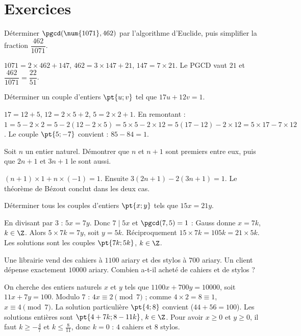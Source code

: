 \mxnewpage
\section{Exercices}
\begin{exercise}
Déterminer $\pgcd(\num{1071},462)$ par l'algorithme d'Euclide, puis simplifier la fraction $\dfrac{462}{\num{1071}}$.
\end{exercise}
\begin{solution}
$\num{1071}=2\times462+147$, $462=3\times147+21$, $147=7\times21$. Le PGCD vaut $21$ et $\dfrac{462}{\num{1071}}=\dfrac{22}{51}$.
\end{solution}

\begin{exercise}
Déterminer un couple d'entiers $\pt{u;v}$ tel que $17u+12v=1$.
\end{exercise}
\begin{solution}
$17=12+5$, $12=2\times5+2$, $5=2\times2+1$. En remontant : $1=5-2\times2=5-2(12-2\times5)=5\times5-2\times12=5(17-12)-2\times12=5\times17-7\times12$. Le couple $\pt{5;-7}$ convient : $85-84=1$.
\end{solution}

\begin{exercise}
Soit $n$ un entier naturel. Démontrer que $n$ et $n+1$ sont premiers entre eux, puis que $2n+1$ et $3n+1$ le sont aussi.
\end{exercise}
\begin{solution}
$(n+1)\times1+n\times(-1)=1$. Ensuite $3(2n+1)-2(3n+1)=1$. Le théorème de Bézout conclut dans les deux cas.
\end{solution}

\begin{exercise}
Déterminer tous les couples d'entiers $\pt{x;y}$ tels que $15x=21y$.
\end{exercise}
\begin{solution}
En divisant par $3$ : $5x=7y$. Donc $7\mid5x$ et $\pgcd(7,5)=1$ : Gauss donne $x=7k$, $k\in\Z$. Alors $5\times7k=7y$, soit $y=5k$. Réciproquement $15\times7k=105k=21\times5k$. Les solutions sont les couples $\pt{7k;5k}$, $k\in\Z$.
\end{solution}

\begin{exercise}
Une librairie vend des cahiers à $\num{1100}$ ariary et des stylos à $700$ ariary. Un client dépense exactement $\num{10000}$ ariary. Combien a-t-il acheté de cahiers et de stylos ?
\end{exercise}
\begin{solution}
On cherche des entiers naturels $x$ et $y$ tels que $\num{1100}x+700y=\num{10000}$, soit $11x+7y=100$. Modulo $7$ : $4x\equiv2\pmod7$ ; comme $4\times2=8\equiv1$, $x\equiv4\pmod7$. La solution particulière $\pt{4;8}$ convient ($44+56=100$). Les solutions entières sont $\pt{4+7k;8-11k}$, $k\in\Z$. Pour avoir $x\ge0$ et $y\ge0$, il faut $k\ge-\frac47$ et $k\le\frac8{11}$, donc $k=0$ : $4$ cahiers et $8$ stylos.
\end{solution}

